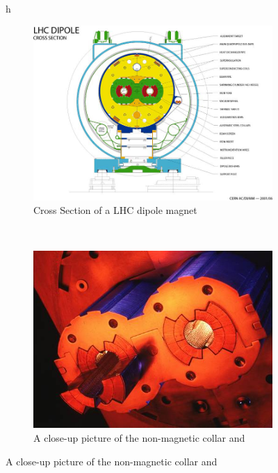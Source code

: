 \begin{figure}{h}
    \centering
    \begin{subfigure}[h]{0.450\textwidth}
        \includegraphics[width=\textwidth]{Figures/LHC_Diagrams/LHC_XSec_Dipole_Magnet__LHC-PHO-2001-187.jpg}
        \caption{Cross Section of a LHC dipole magnet \cite{lhc:machine_description}}\label{fig:lhc_dipole_xs}
      \end{subfigure}
      ~ %
    \begin{subfigure}[h]{0.450\textwidth}
        \includegraphics[width=\textwidth]{Figures/LHC_Diagrams/LHC_Dipole_CollarAndCoils.jpg}
        \caption{A close-up picture of the non-magnetic collar and
}
\end{subfigure}
\end{figure}
